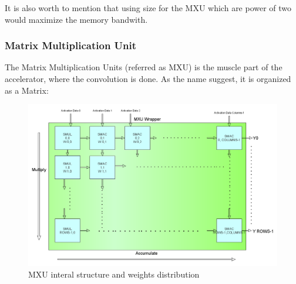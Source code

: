 It is also worth to mention that using size for the MXU which are power of two would maximize the memory bandwith.

\newpage
\subsubsection{Matrix Multiplication Unit}
The Matrix Multiplication Units (referred as MXU) is the muscle part of the accelerator, where the convolution is done.
As the name suggest, it is organized as a Matrix:
\begin{figure}[H]
\centering
\captionsetup{justification=centering}
\includegraphics[scale=0.35,angle=0]{./figure/mxu.png}
\caption{MXU interal structure and weights distribution}
\label{fig:mxu}
\end{figure} 

